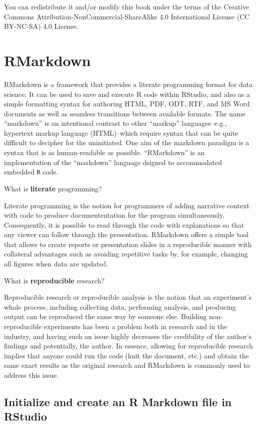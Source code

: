 \documentclass[]{book}
\theoremstyle{definition}
\theoremstyle{definition}
\theoremstyle{remark}
\begin{document}
You can redistribute it and/or modify this book under the terms of the
Creative Commons Attribution-NonCommercial-ShareAlike 4.0 International
License (CC BY-NC-SA) 4.0 License.

\chapter{RMarkdown}\label{rmarkdown}

RMarkdown is a framework that provides a literate programming format for
data science. It can be used to save and execute R code within RStudio,
and also as a simple formatting syntax for authoring HTML, PDF, ODT,
RTF, and MS Word documents as well as seamless transitions between
available formats. The name ``markdown'' is an intentional contrast to
other ``markup'' languages--e.g., hypertext markup language
(HTML)--which require syntax that can be quite difficult to decipher for
the uninitiated. One aim of the markdown paradigm is a syntax that is as
human-readable as possible. ``RMarkdown'' is an implementation of the
``markdown'' language dsigned to accommodated embedded \texttt{R} code.

What is \textbf{literate} programming?

Literate programming is the notion for programmers of adding narrative
context with code to produce documententation for the program
simultaneously. Consequently, it is possible to read through the code
with explanations so that any viewer can follow through the
presentation. RMarkdown offers a simple tool that allows to create
reports or presentation slides in a reproducible manner with collateral
advantages such as avoiding repetitive tasks by, for example, changing
all figures when data are updated.

What is \textbf{reproducible} research?

Reproducible research or reproducible analysis is the notion that an
experiment's whole process, including collecting data, performing
analysis, and producing output can be reproduced the same way by someone
else. Building non-reproducible experiments has been a problem both in
research and in the industry, and having such an issue highly decreases
the credibility of the author's findings and potentially, the author. In
essence, allowing for reproducible research implies that anyone could
run the code (knit the document, etc.) and obtain the same exact results
as the original research and RMarkdown is commonly used to address this
issue.

\section{Initialize and create an R Markdown file in
RStudio}\label{initialize-and-create-an-r-markdown-file-in-rstudio}
\end{document}
